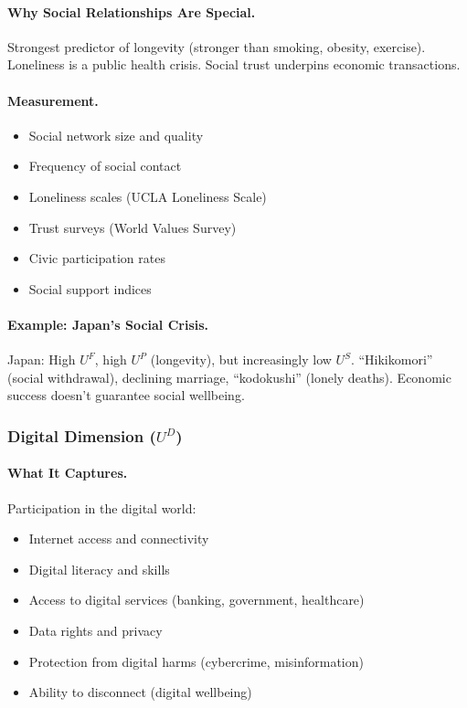 \documentclass[12pt,a4paper]{article}
\begin{document}
\paragraph{Why Social Relationships Are Special.}
Strongest predictor of longevity (stronger than smoking, obesity, exercise).
Loneliness is a public health crisis.
Social trust underpins economic transactions.

\paragraph{Measurement.}
\begin{itemize}
  \item Social network size and quality
  \item Frequency of social contact
  \item Loneliness scales (UCLA Loneliness Scale)
  \item Trust surveys (World Values Survey)
  \item Civic participation rates
  \item Social support indices
\end{itemize}

\paragraph{Example: Japan's Social Crisis.}
Japan: High $U^F$, high $U^P$ (longevity), but increasingly low $U^S$.
``Hikikomori'' (social withdrawal), declining marriage, ``kodokushi'' (lonely deaths).
Economic success doesn't guarantee social wellbeing.

\subsubsection{Digital Dimension ($U^D$)}

\paragraph{What It Captures.}
Participation in the digital world:
\begin{itemize}
  \item Internet access and connectivity
  \item Digital literacy and skills
  \item Access to digital services (banking, government, healthcare)
  \item Data rights and privacy
  \item Protection from digital harms (cybercrime, misinformation)
  \item Ability to disconnect (digital wellbeing)
\end{itemize}
\end{document}
